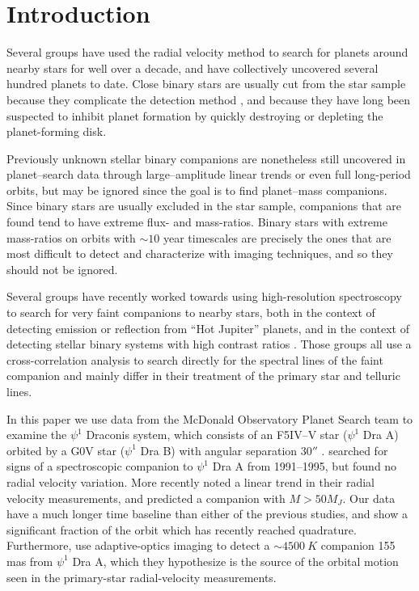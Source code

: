 

\section{Introduction}
\label{sec:intro}
Several groups \citep[e.g.][]{Wittenmyer2006, Fischer2009, Pepe2011} have used the radial velocity method to search for planets around nearby stars for well over a decade, and have collectively uncovered several hundred planets to date. Close binary stars are usually cut from the star sample because they complicate the detection method \citep[e.g.][]{Bergmann2015}, and because they have long been suspected to inhibit planet formation by quickly destroying \citep{Kraus2012} or depleting \citep{Harris2012} the planet-forming disk.

Previously unknown stellar binary companions are nonetheless still uncovered in planet--search data through large--amplitude linear trends or even full long-period orbits, but may be ignored since the goal is to find planet--mass companions. Since binary stars are usually excluded in the star sample, companions that are found tend to have extreme flux- and mass-ratios. Binary stars with extreme mass-ratios on orbits with $\sim 10$ year timescales are precisely the ones that are most difficult to detect and characterize with imaging techniques, and so they should not be ignored.

Several groups have recently worked towards using high-resolution spectroscopy to search for very faint companions to nearby stars, both in the context of detecting emission \citep{Snellen2010, Gullikson2013} or reflection \citep{Martins2013} from ``Hot Jupiter'' planets, and in the context of detecting stellar binary systems with high contrast ratios \citep[e.g.][]{Gullikson2013_2, Kolbl2015}. Those groups all use a cross-correlation analysis to search directly for the spectral lines of the faint companion and mainly differ in their treatment of the primary star and telluric lines.

In this paper we use data from the McDonald Observatory Planet Search team to examine the $\psi^1$ Draconis system, which consists of an F5IV--V star ($\psi^1$ Dra A) orbited by a G0V star ($\psi^1$ Dra B) with angular separation $30''$ \citep{WDS}. \cite{Tokovinin2002} searched for signs of a spectroscopic companion to $\psi^1$ Dra A from 1991--1995, but found no radial velocity variation. More recently \cite{Toyota2009} noted a linear trend in their radial velocity measurements, and predicted a companion with $M > 50 M_J$. Our data have a much longer time baseline than either of the previous studies, and show a significant fraction of the orbit which has recently reached quadrature. Furthermore, \citet{Endl2015} use adaptive-optics imaging to detect a $\sim 4500\ K$ companion 155 mas from $\psi^1$ Dra A, which they hypothesize is the source of the orbital motion seen in the primary-star radial-velocity measurements. 

